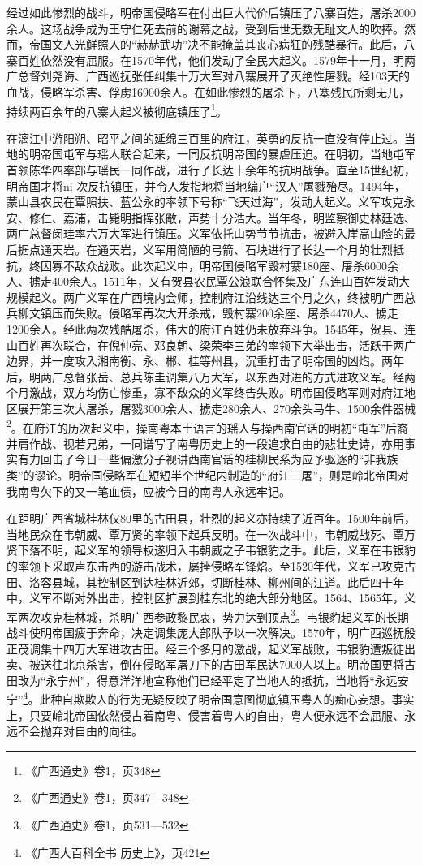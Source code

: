 经过如此惨烈的战斗，明帝国侵略军在付出巨大代价后镇压了八寨百姓，屠杀2000余人。这场战争成为王守仁死去前的谢幕之战，受到后世无数无耻文人的吹捧。然而，帝国文人光鲜照人的“赫赫武功”决不能掩盖其丧心病狂的残酷暴行。此后，八寨百姓依然没有屈服。在1570年代，他们发动了全民大起义。1579年十一月，明两广总督刘尧诲、广西巡抚张任纠集十万大军对八寨展开了灭绝性屠戮。经103天的血战，侵略军杀害、俘虏16900余人。在如此惨烈的屠杀下，八寨残民所剩无几，持续两百余年的八寨大起义被彻底镇压了\footnote{《广西通史》卷1，页348}。

在漓江中游阳朔、昭平之间的延绵三百里的府江，英勇的反抗一直没有停止过。当地的明帝国屯军与瑶人联合起来，一同反抗明帝国的暴虐压迫。在明初，当地屯军首领陈华四率部与瑶民一同作战，进行了长达十余年的抗明战争。直至15世纪初，明帝国才将ni 次反抗镇压，并令人发指地将当地编户“汉人”屠戮殆尽。1494年，蒙山县农民在覃照扶、蓝公永的率领下号称“飞天过海”，发动大起义。义军攻克永安、修仁、荔浦，击毙明指挥张敞，声势十分浩大。当年冬，明监察御史林廷选、两广总督闵珪率六万大军进行镇压。义军依托山势节节抗击，被避入崖高山险的最后据点通天岩。在通天岩，义军用简陋的弓箭、石块进行了长达一个月的壮烈抵抗，终因寡不敌众战败。此次起义中，明帝国侵略军毁村寨180座、屠杀6000余人、掳走400余人。1511年，又有贺县农民覃公浪联合怀集及广东连山百姓发动大规模起义。两广义军在广西境内会师，控制府江沿线达三个月之久，终被明广西总兵柳文镇压而失败。侵略军再次大开杀戒，毁村寨200余座、屠杀4470人、掳走1200余人。经此两次残酷屠杀，伟大的府江百姓仍未放弃斗争。1545年，贺县、连山百姓再次联合，在倪仲亮、邓良朝、梁荣李三弟的率领下大举出击，活跃于两广边界，并一度攻入湘南衡、永、郴、桂等州县，沉重打击了明帝国的凶焰。两年后，明两广总督张岳、总兵陈圭调集八万大军，以东西对进的方式进攻义军。经两个月激战，双方均伤亡惨重，寡不敌众的义军终告失败。明帝国侵略军则对府江地区展开第三次大屠杀，屠戮3000余人、掳走280余人、270余头马牛、1500余件器械\footnote{《广西通史》卷1，页347—348}。在府江的历次起义中，操南粤本土语言的瑶人与操西南官话的明初“屯军”后裔并肩作战、视若兄弟，一同谱写了南粤历史上的一段追求自由的悲壮史诗，亦用事实有力回击了今日一些偏激分子视讲西南官话的桂柳民系为应予驱逐的“非我族类”的谬论。明帝国侵略军在短短半个世纪内制造的“府江三屠”，则是岭北帝国对我南粤欠下的又一笔血债，应被今日的南粤人永远牢记。

在距明广西省城桂林仅80里的古田县，壮烈的起义亦持续了近百年。1500年前后，当地民众在韦朝威、覃万贤的率领下起兵反明。在一次战斗中，韦朝威战死、覃万贤下落不明，起义军的领导权遂归入韦朝威之子韦银豹之手。此后，义军在韦银豹的率领下采取声东击西的游击战术，屡挫侵略军锋焰。至1520年代，义军已攻克古田、洛容县城，其控制区到达桂林近郊，切断桂林、柳州间的江道。此后四十年中，义军不断对外出击，控制区扩展到桂东北的绝大部分地区。1564、1565年，义军两次攻克桂林城，杀明广西参政黎民衷，势力达到顶点\footnote{《广西通史》卷1，页531—532}。韦银豹起义军的长期战斗使明帝国疲于奔命，决定调集庞大部队予以一次解决。1570年，明广西巡抚殷正茂调集十四万大军进攻古田。经三个多月的激战，起义军战败，韦银豹遭叛徒出卖、被送往北京杀害，倒在侵略军屠刀下的古田军民达7000人以上。明帝国更将古田改为“永宁州”，得意洋洋地宣称他们已经平定了当地人的抵抗，当地将“永远安宁”\footnote{《广西大百科全书 历史上》，页421}。此种自欺欺人的行为无疑反映了明帝国意图彻底镇压粤人的痴心妄想。事实上，只要岭北帝国依然侵占着南粤、侵害着粤人的自由，粤人便永远不会屈服、永远不会抛弃对自由的向往。

